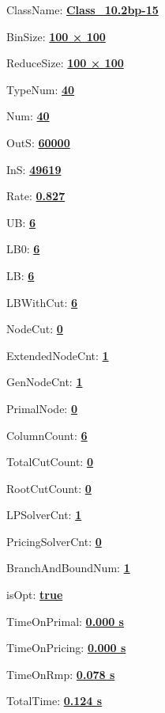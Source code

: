 \documentclass[11pt]{article}
\begin{document}
\pagestyle{empty}


ClassName: \underline{\textbf{Class_10.2bp-15}}
\par
BinSize: \underline{\textbf{100 × 100}}
\par
ReduceSize: \underline{\textbf{100 × 100}}
\par
TypeNum: \underline{\textbf{40}}
\par
Num: \underline{\textbf{40}}
\par
OutS: \underline{\textbf{60000}}
\par
InS: \underline{\textbf{49619}}
\par
Rate: \underline{\textbf{0.827}}
\par
UB: \underline{\textbf{6}}
\par
LB0: \underline{\textbf{6}}
\par
LB: \underline{\textbf{6}}
\par
LBWithCut: \underline{\textbf{6}}
\par
NodeCut: \underline{\textbf{0}}
\par
ExtendedNodeCnt: \underline{\textbf{1}}
\par
GenNodeCnt: \underline{\textbf{1}}
\par
PrimalNode: \underline{\textbf{0}}
\par
ColumnCount: \underline{\textbf{6}}
\par
TotalCutCount: \underline{\textbf{0}}
\par
RootCutCount: \underline{\textbf{0}}
\par
LPSolverCnt: \underline{\textbf{1}}
\par
PricingSolverCnt: \underline{\textbf{0}}
\par
BranchAndBoundNum: \underline{\textbf{1}}
\par
isOpt: \underline{\textbf{true}}
\par
TimeOnPrimal: \underline{\textbf{0.000 s}}
\par
TimeOnPricing: \underline{\textbf{0.000 s}}
\par
TimeOnRmp: \underline{\textbf{0.078 s}}
\par
TotalTime: \underline{\textbf{0.124 s}}
\par
\newpage


\end{document}
